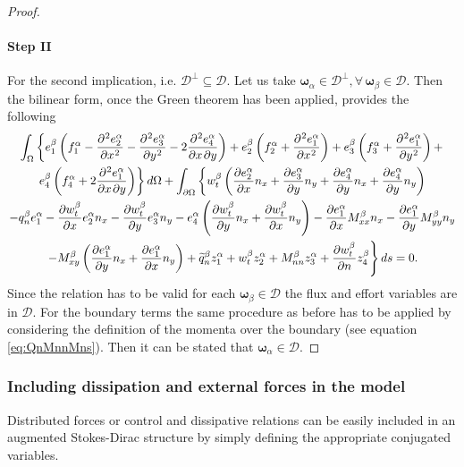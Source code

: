 \documentclass[preprint,12pt]{elsarticle}
\begin{document}
\begin{proof}
	\paragraph{\textbf{Step II}}
	For the second implication, i.e. $\mathcal{D}^{\perp} \subseteq \mathcal{D}$. Let us take $\bm\omega_\alpha \in \mathcal{D}^{\perp}, \forall \, \bm\omega_\beta \in \mathcal{D}$. Then the bilinear form, once the Green theorem has been applied, provides the following
	\begin{multline}
	\int_{\Omega} \left\{ e_1^\beta \left( f_1^\alpha - \diffp[2]{e_2^\alpha}{x} - \diffp[2]{e_3^\alpha}{y} - 2 \diffp{e_4^\alpha}{x,y}  \right) + e_2^\beta \left( f_2^\alpha + \diffp[2]{e_1^\alpha}{x}  \right) + e_3^\beta \left( f_3^\alpha + \diffp[2]{e_1^\alpha}{y}  \right) + \right. \\
	\left. e_4^\beta \left( f_4^\alpha + 2 \diffp{e_1^\alpha}{x,y}  \right)  \right\} d\Omega + \int_{\partial \Omega} \left\{ w_t^\beta \left( \diffp{e_2^\alpha}{x} n_x + \diffp{e_3^\alpha}{y} n_y + \diffp{e_4^\alpha}{y} n_x + \diffp{e_4^\alpha}{y} n_y  \right)  \right. \\
	\left.  - q_n^\beta e_1^\alpha - \diffp{w_t^\beta}{x} e_2^\alpha n_x - \diffp{w_t^\beta}{y} e_3^\alpha n_y   - e_4^\alpha \left( \diffp{w_t^\beta}{y} n_x + \diffp{w_t^\beta}{x} n_y  \right) - \diffp{e_1^\alpha}{x} M_{xx}^\beta n_x  - \diffp{e_1^\alpha}{y} M_{yy}^\beta n_y \right.  \\ 
	\left. - M_{xy}^\beta \left(\diffp{e_1^\alpha}{y} n_x + \diffp{e_1^\alpha}{x} n_y  \right) + \widetilde{q}_n^\beta z_1^\alpha + w_t^\beta z_2^\alpha + M_{nn}^\beta z_3^\alpha + \diffp{w_t^\beta}{n} z_4^\beta \right\} ds = 0. 
	\end{multline}
	Since the relation has to be valid for each $\bm\omega_\beta \in \mathcal{D}$ the flux and effort variables are in $\mathcal{D}$. For the boundary terms the same procedure as before has to be applied by considering the definition of the momenta over the boundary (see equation \eqref{eq:QnMnnMns}). Then it can be stated that $\bm\omega_\alpha \in \mathcal{D}$.
\end{proof}

\subsubsection{Including dissipation and external forces in the model}
	Distributed forces or control and dissipative relations can be easily included in an augmented Stokes-Dirac structure by simply defining the appropriate conjugated variables. \\
	
\end{document}
